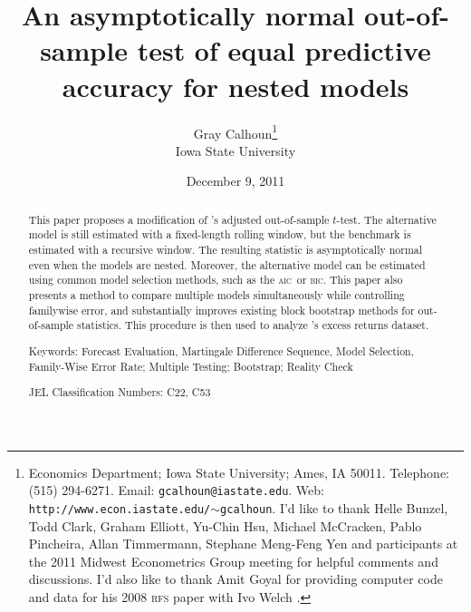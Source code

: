 \documentclass[11pt,fleqn]{article}
\newcommand\citepos[2][]{\citeauthor{#2}'s \citeyearpar[#1]{#2}}
\theoremstyle{definition}
\newcommand{\aic}{\textsc{aic}}
\newcommand{\bic}{\textsc{bic}}
\begin{document}
\author{Gray Calhoun\thanks{ Economics Department; Iowa State
    University; Ames, IA 50011.  Telephone: (515) 294-6271.  Email:
    \texttt{gcalhoun@iastate.edu}.  Web:
    \texttt{http://www.econ.iastate.edu/$\sim$gcalhoun}.  I'd like to
    thank Helle Bunzel, Todd Clark, Graham Elliott, Yu-Chin Hsu,
    Michael McCracken, Pablo Pincheira, Allan Timmermann, Stephane
    Meng-Feng Yen and participants at the 2011 Midwest Econometrics
    Group meeting for helpful comments and discussions.  I'd also like to thank Amit
    Goyal for providing computer code and data for his 2008
    \textsc{rfs} paper with Ivo
    Welch \citep{GoW:08}.} \\
  Iowa State University}

\title{An asymptotically normal out-of-sample
  test of equal predictive accuracy for nested models} 

\date{December 9, 2011}

\maketitle

\begin{abstract} 
  \noindent This paper proposes a modification of \citepos[\textit{J.
    Econom.}]{ClW:07} adjusted out-of-sample $t$-test.  The
  alternative model is still estimated with a fixed-length rolling
  window, but the benchmark is estimated with a recursive window. The
  resulting statistic is asymptotically normal even when the models
  are nested.  Moreover, the alternative model can be estimated using
  common model selection methods, such as the \aic\ or \bic.  This
  paper also presents a method to compare multiple models
  simultaneously while controlling familywise error, and
  substantially improves existing block bootstrap methods for
  out-of-sample statistics.  This procedure is then used to analyze
  \citepos[\textit{Rev. Finan. Stud.}]{GoW:08} excess returns dataset.

\strut

\noindent Keywords: Forecast Evaluation, Martingale Difference
Sequence, Model Selection, Family-Wise Error Rate; Multiple Testing;
Bootstrap; Reality Check

\strut

\noindent JEL Classification Numbers: C22, C53

\end{abstract}

\newpage 
{}
\end{document}
